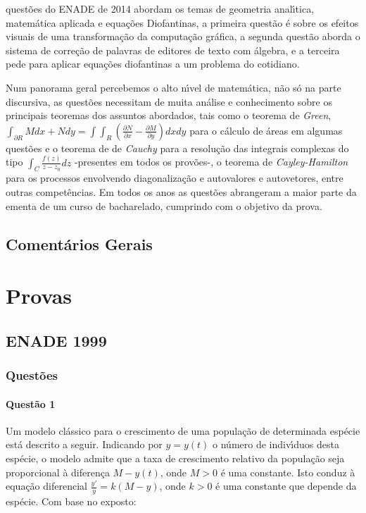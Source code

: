 \documentclass{report}
\begin{document}
quest\~oes do ENADE de 2014 abordam os temas de geometria anal\'\i tica, matem\'atica aplicada e equa\c c\~oes Diofantinas, a primeira quest\~ao \'e sobre os efeitos visuais de uma transforma\c c\~ao da computa\c c\~ao gr\'afica, a segunda quest\~ao aborda o sistema de corre\c c\~ao de palavras de editores de texto com \'algebra, e a terceira pede para aplicar equa\c c\~oes diofantinas a um problema do cotidiano.

Num panorama geral percebemos o alto n\'\i vel de matem\'atica, n\~ao s\'o na parte discursiva, as quest\~oes necessitam de muita an\'alise e conhecimento sobre os principais teoremas dos assuntos abordados, tais como o teorema de {\it Green}, $\displaystyle \int_{\partial R} M dx + N dy= \int\!\int_R \left( \frac{\partial N}{\partial x} - \frac{\partial M}{\partial y}\right) dx dy $ para o c\'alculo de \'areas em algumas quest\~oes e o teorema de de {\it Cauchy} para a resolu\c c\~ao das integrais complexas do tipo $\displaystyle \int_C \frac{f(z)}{z-z_0} dz$ -presentes em todos os prov\~oes-, o teorema de {\it Cayley-Hamilton} para os processos envolvendo diagonaliza\c c\~ao e autovalores e autovetores, entre outras compet\^encias. Em todos os anos as quest\~oes abrangeram a maior parte da ementa de um curso de bacharelado, cumprindo com o objetivo da prova.

\chapter{Coment\'arios Gerais}

\part{Provas}
 


\chapter{ENADE 1999}

\section{\color{blue} Quest\~oes}

\subsection{\color{blue} Quest\~ao 1}

Um modelo cl\'assico para o crescimento de uma popula\c c\~ao de determinada esp\'ecie est\'a descrito a seguir. Indicando por
$y = y(t)$ o n\'umero de indiv\'\i duos desta esp\'ecie, o modelo admite que a taxa de crescimento relativo da popula\c c\~ao seja proporcional
\`a diferen\c ca $M - y(t)$, onde $M > 0$ \'e uma constante. Isto conduz \`a equa\c c\~ao diferencial $\displaystyle \frac{y'}{y}= k (M - y)$, onde $k > 0$ \'e uma constante que depende da esp\'ecie. Com base no exposto:
\end{document}
